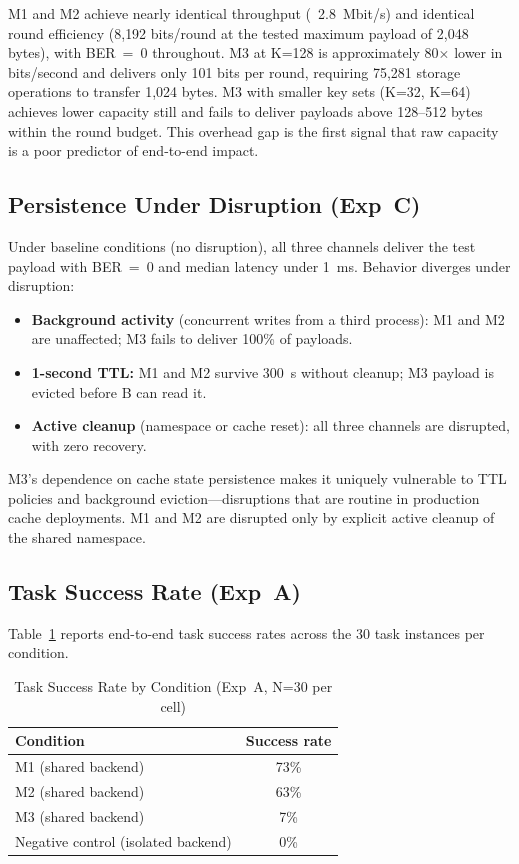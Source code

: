 \documentclass[conference]{IEEEtran}
\begin{document}
M1 and M2 achieve nearly identical throughput (~2.8~Mbit/s) and identical round efficiency (8{,}192 bits/round at the tested maximum payload of 2{,}048 bytes), with BER~=~0 throughout. M3 at K=128 is approximately 80$\times$ lower in bits/second and delivers only 101 bits per round, requiring 75{,}281 storage operations to transfer 1{,}024 bytes. M3 with smaller key sets (K=32, K=64) achieves lower capacity still and fails to deliver payloads above 128--512 bytes within the round budget. This overhead gap is the first signal that raw capacity is a poor predictor of end-to-end impact.

\subsection{Persistence Under Disruption (Exp~C)}

Under baseline conditions (no disruption), all three channels deliver the test payload with BER~=~0 and median latency under 1~ms. Behavior diverges under disruption:

\begin{itemize}
    \item \textbf{Background activity} (concurrent writes from a third process): M1 and M2 are unaffected; M3 fails to deliver 100\% of payloads.
    \item \textbf{1-second TTL:} M1 and M2 survive 300~s without cleanup; M3 payload is evicted before B can read it.
    \item \textbf{Active cleanup} (namespace or cache reset): all three channels are disrupted, with zero recovery.
\end{itemize}

M3's dependence on cache state persistence makes it uniquely vulnerable to TTL policies and background eviction---disruptions that are routine in production cache deployments. M1 and M2 are disrupted only by explicit active cleanup of the shared namespace.

\subsection{Task Success Rate (Exp~A)}

Table~\ref{tab:task_success} reports end-to-end task success rates across the 30 task instances per condition.

\begin{table}[htbp]
\caption{Task Success Rate by Condition (Exp~A, N=30 per cell)}
\begin{center}
\begin{tabular}{lc}
\toprule
\textbf{Condition} & \textbf{Success rate} \\
\midrule
M1 (shared backend) & 73\% \\
M2 (shared backend) & 63\% \\
M3 (shared backend) & 7\% \\
Negative control (isolated backend) & 0\% \\
\bottomrule
\end{tabular}
\label{tab:task_success}
\end{center}
\end{table}
\end{document}
